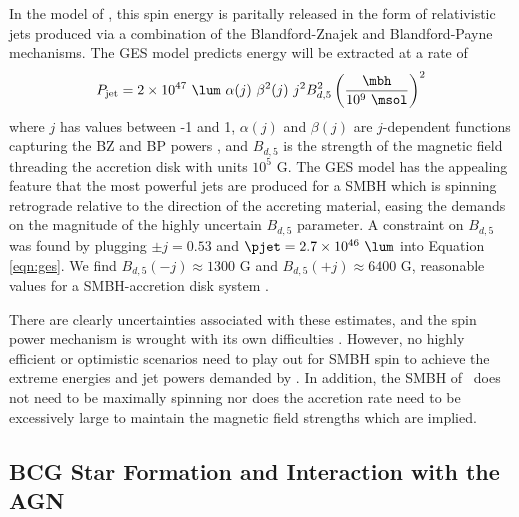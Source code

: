 \documentclass[iop]{emulateapj}
\begin{document}
In the model of \citet[][GES hereafter]{gesspin}, this spin energy is
paritally released in the form of relativistic jets produced via a
combination of the Blandford-Znajek \citep[BZ;][]{bz} and
Blandford-Payne \citep[BP;][]{1982MNRAS.199..883B} mechanisms. The GES
model predicts energy will be extracted at a rate of
\begin{equation}
  P_{\rm{jet}} = 2 \times 10^{47} ~{\lum} ~\alpha(j) ~\beta^2(j) ~j^2
  B_{d,5}^2 \left(\frac{\mbh}{10^9 ~\msol}\right)^2
  \label{eqn:ges}
\end{equation}
where $j$ has values between -1 and 1, $\alpha(j)$ and $\beta(j)$ are
$j$-dependent functions capturing the BZ and BP powers
\citep[see][]{2009ApJ...699L..52G}, and $B_{d,5}$ is the strength of
the magnetic field threading the accretion disk with units $10^5$
G. The GES model has the appealing feature that the most powerful jets
are produced for a SMBH which is spinning retrograde relative to the
direction of the accreting material, easing the demands on the
magnitude of the highly uncertain $B_{d,5}$ parameter. A constraint on
$B_{d,5}$ was found by plugging $\pm j=0.53$ and $\pjet = 2.7 \times
10^{46} ~\lum$ into Equation \ref{eqn:ges}. We find $B_{d,5}(-j)
\approx 1300$ G and $B_{d,5}(+j) \approx 6400$ G, reasonable values
for a SMBH-accretion disk system
\citep[\eg][]{2002Sci...295.1688K}.

There are clearly uncertainties associated with these estimates, and
the spin power mechanism is wrought with its own difficulties
\citep[see][for thorough discussion]{msspin}. However, no highly
efficient or optimistic scenarios need to play out for SMBH spin to
achieve the extreme energies and jet powers demanded by \rbs. In
addition, the SMBH of \rbs\ does not need to be maximally spinning nor
does the accretion rate need to be excessively large to maintain the
magnetic field strengths which are implied.

\subsection{BCG Star Formation and Interaction with the AGN}
\label{sec:bcg}
\end{document}
